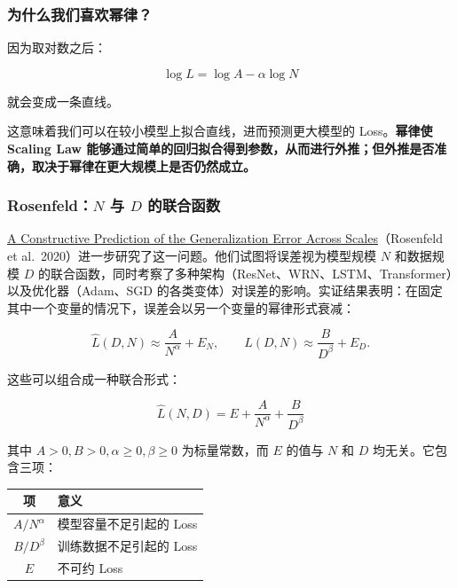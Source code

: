 \documentclass[
  11pt,
  a4paper,
  fontset=none]{ctexart}
\newcounter{none} %
\newenvironment{NotesFormula}{%
  \par\noindent\begin{minipage}{\linewidth}%
  \setlength{\parindent}{2em}%
  \setlength{\parskip}{0.35em}%
}{\end{minipage}\par}
\begin{document}
\subsubsection{为什么我们喜欢幂律？}\label{ux4e3aux4ec0ux4e48ux6211ux4eecux559cux6b22ux5e42ux5f8b}

\begin{NotesFormula}

因为取对数之后：

\[\log L=\log A-\alpha\log N\]

\end{NotesFormula}

就会变成一条直线。

这意味着我们可以在较小模型上拟合直线，进而预测更大模型的
Loss。\textbf{幂律使 Scaling Law
能够通过简单的回归拟合得到参数，从而进行外推；但外推是否准确，取决于幂律在更大规模上是否仍然成立。}

\subsubsection{\texorpdfstring{Rosenfeld：\(N\) 与 \(D\)
的联合函数}{Rosenfeld：N 与 D 的联合函数}}\label{rosenfeldn-ux4e0e-d-ux7684ux8054ux5408ux51fdux6570}

\begin{NotesFormula}

\href{https://arxiv.org/abs/1909.12673}{A Constructive Prediction of the
Generalization Error Across Scales}（Rosenfeld et
al.~2020）进一步研究了这一问题。他们试图将误差视为模型规模 \(N\)
和数据规模 \(D\)
的联合函数，同时考察了多种架构（ResNet、WRN、LSTM、Transformer）以及优化器（Adam、SGD
的各类变体）对误差的影响。实证结果表明：在固定其中一个变量的情况下，误差会以另一个变量的幂律形式衰减：

\[\hat L(D,N)\approx\frac{A}{N^\alpha}+E_N,\qquad
\hat L(D,N)\approx\frac{B}{D^\beta}+E_D.\]

\end{NotesFormula}

\begin{NotesFormula}

这些可以组合成一种联合形式：

\[\boxed{\hat L(N,D)=E+\frac{A}{N^\alpha}+\frac{B}{D^\beta}}\]

\end{NotesFormula}

其中 \(A>0,B>0,\alpha\ge0,\beta\ge0\) 为标量常数，而 \(E\) 的值与 \(N\)
和 \(D\) 均无关。它包含三项：

{\def\LTcaptype{none} %
\begin{longtable}[]{@{}cl@{}}
\toprule\noalign{}
\textbf{项} & \textbf{意义} \\
\midrule\noalign{}
\endhead
\bottomrule\noalign{}
\endlastfoot
\(A/N^\alpha\) & 模型容量不足引起的 Loss \\
\(B/D^\beta\) & 训练数据不足引起的 Loss \\
\(E\) & 不可约 Loss \\
\end{longtable}
}
\end{document}
